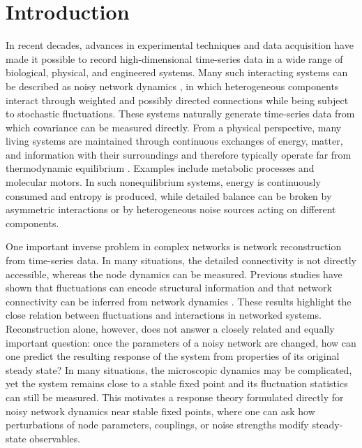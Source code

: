 \section{Introduction}
\quad In recent decades, advances in experimental techniques and data acquisition have made it possible to record high-dimensional time-series data in a wide range of biological, physical, and engineered systems. Many such interacting systems can be described as noisy network dynamics \cite{strogatz2001exploring, Mark2003, Mark2018}, in which heterogeneous components interact through weighted and possibly directed connections while being subject to stochastic fluctuations. These systems naturally generate time-series data from which covariance can be measured directly. From a physical perspective, many living systems are maintained through continuous exchanges of energy, matter, and information with their surroundings and therefore typically operate far from thermodynamic equilibrium \cite{PhysRevLett.71.2401, 10.1143/PTPS.130.29, sekimoto2010stochastic, PhysRevE.96.032123, PhysRevE.96.012601, Shiraishi2023}. Examples include metabolic processes and molecular motors. In such nonequilibrium systems, energy is continuously consumed and entropy is produced, while detailed balance can be broken by asymmetric interactions or by heterogeneous noise sources acting on different components.\par

One important inverse problem in complex networks is network reconstruction from time-series data. In many situations, the detailed connectivity is not directly accessible, whereas the node dynamics can be measured. Previous studies have shown that fluctuations can encode structural information and that network connectivity can be inferred from network dynamics \cite{PhysRevLett.104.058701, ching2013, ching2015, ching2017, Lai2017, ChengLai2022}. These results highlight the close relation between fluctuations and interactions in networked systems. Reconstruction alone, however, does not answer a closely related and equally important question: once the parameters of a noisy network are changed, how can one predict the resulting response of the system from properties of its original steady state? In many situations, the microscopic dynamics may be complicated, yet the system remains close to a stable fixed point and its fluctuation statistics can still be measured. This motivates a response theory formulated directly for noisy network dynamics near stable fixed points, where one can ask how perturbations of node parameters, couplings, or noise strengths modify steady-state observables.\par

